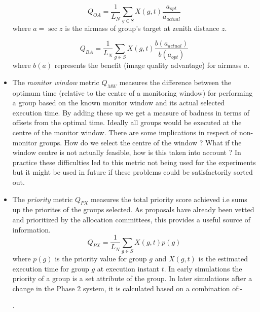 \begin{itemize}
\begin{equation}
Q_{OA} = \frac{1}{L_N}\sum_{g \in S}{X(g,t)\frac{a_{opt}}{a_{actual}}}
\end{equation}
where $a = \sec{z}$ is the airmass of group's target at zenith distance $z$.

\begin{equation}
Q_{BA} = \frac{1}{L_N}\sum_{g \in S}{X(g,t)\frac{b(a_{actual})}{b(a_{opt})}}
\end{equation}
where $b(a)$ represents the benefit (image quality advantage) for airmass $a$.

\item The \emph{monitor window} metric $Q_{MW}$  measures the difference between the optimum time (relative to the centre of a monitoring window) for performing a group based on the known monitor window and its actual selected execution time. By adding these up we get a measure of badness in terms of offsets from the optimal time. Ideally all groups would be executed at the centre of the monitor window. There are some implications in respect of non-monitor groups. How do we select the centre of the window ? What if the window centre is not actually feasible, how is this taken into account ? In practice these difficulties led to this metric not being used for the experiments but it might be used in future if these problems could be satisfactorily sorted out.

\item The \emph{priority} metric $Q_{PX}$  measures the total priority score achieved i.e  sums up the priorites of the groups selected. As proposals have already been vetted and prioritized by the allocation committees, this provides a useful source of information. %
\begin{equation}
Q_{PX} = \frac{1}{L_N}\sum_{g \in S}{X(g,t)p(g)}
\end{equation}
where $p(g)$ is the priority value for group $g$ and $X(g,t)$ is the estimated execution time for group $g$ at execution instant $t$. In early simulations the priority of a group is a set attribute of the group. In later simulations after a change in the Phase 2 system, it is calculated based on a combination of:- .


\end{itemize}
